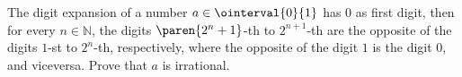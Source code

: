 The digit expansion of a number $a \in \ointerval{0}{1}$ has $0$ as first digit,
then for every $n \in \mathbb{N}$,
the digits $\paren{2^n + 1}$-th to $2^{n+1}$-th
are the opposite of the digits $1$-st to $2^{n}$-th, respectively,
where the opposite of the digit $1$ is the digit $0$, and viceversa.
Prove that $a$ is irrational.
